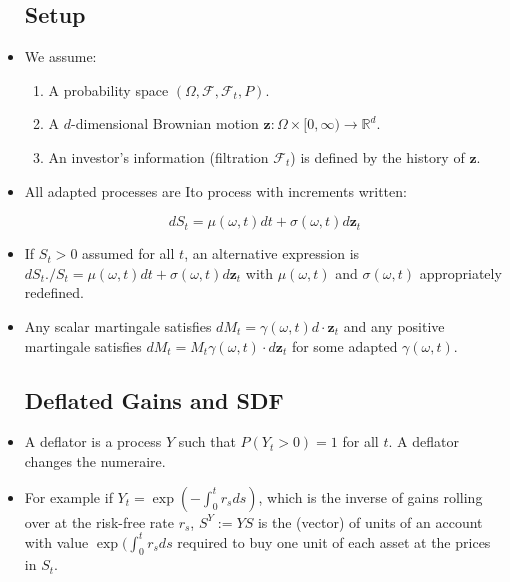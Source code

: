 \documentclass{article}
\newcommand{\R}{\mathbb{R}}
\newcommand{\F}{\mathcal{F}}
\newcommand{\zbf}{\mathbf{z}}
\begin{document}
\begin{itemize}

\subsection*{Setup}

\item We assume:

\begin{enumerate}

\item A probability space $(\Omega, \F, \F_t, P)$.

\item A $d$-dimensional Brownian motion $\zbf: \Omega \times [0, \infty) \to \R^d$.

\item An investor's information (filtration $\F_t$) is defined by the history of $\zbf$.

\end{enumerate}

\item All adapted processes are Ito process with increments written:

$$
dS_t = \mu(\omega, t) dt + \sigma(\omega, t) d\zbf_t
$$

\item If $S_t > 0$ assumed for all $t$, an alternative expression is $dS_t ./S_t = \mu(\omega, t) dt + \sigma(\omega, t) d\zbf_t$ with $\mu(\omega, t)$ and $\sigma(\omega, t)$ appropriately redefined.

\item Any scalar martingale satisfies $dM_t = \gamma(\omega, t) d \cdot \zbf_t$ and any positive martingale satisfies $dM_t = M_t \gamma(\omega, t) \cdot d\zbf_t$ for some adapted $\gamma(\omega, t)$.

\subsection*{Deflated Gains and SDF}

\item A deflator is a process $Y$ such that $P(Y_t > 0) = 1$ for all $t$.  A deflator changes the numeraire.

\item For example if $Y_t = \exp(-\int_0^t r_s ds)$, which is the inverse of gains rolling over at the risk-free rate $r_s$, $S^Y := YS$ is the (vector) of units of an account with value $\exp(\int_0^t r_s ds$ required to buy one unit of each asset at the prices in $S_t$.


\end{itemize}
\end{document}
